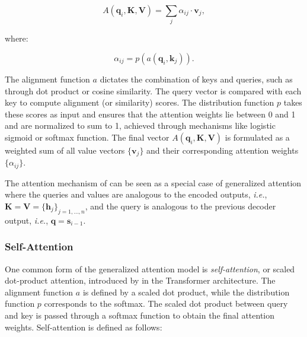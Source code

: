 

\begin{equation}
    A(\bm{q}_i, \bm{K}, \bm{V}) = \sum_j \alpha_{ij} \cdot \bm{v}_j,
\end{equation}

\noindent where:

\begin{equation}
    \alpha_{ij} = p(a(\bm{q}_i, \bm{k}_j)).
\end{equation}

\noindent The alignment function $a$ dictates the combination of keys and queries, such as through dot product or cosine similarity. The query vector is compared with each key to compute alignment (or similarity) scores. The distribution function $p$ takes these scores as input and ensures that the attention weights lie between 0 and 1 and are normalized to sum to 1, achieved through mechanisms like logistic sigmoid or softmax function. The final vector $A(\bm{q}_i, \bm{K}, \bm{V})$ is formulated as a weighted sum of all value vectors $\{\bm{v}_j\}$ and their corresponding attention weights $\{\alpha_{ij}\}$.

The attention mechanism of \citet{bahdanau2014neural} can be seen as a special case of generalized attention where the queries and values are analogous to the encoded outputs, \textit{i.e.}, $\bm{K} = \bm{V} = \{\bm{h}_j\}_{j=1, \ldots, n}$, and the query is analogous to the previous decoder output, \textit{i.e.}, $\bm{q} = \bm{s}_{i-1}$. 


\subsubsection{Self-Attention} 

One common form of the generalized attention model is \textit{self-attention}, or scaled dot-product attention, introduced by \citet{vaswani2017attention} in the Transformer architecture. The alignment function $a$ is defined by a scaled dot product, while the distribution function $p$ corresponds to the softmax. The scaled dot product between query and key is passed through a softmax function to obtain the final attention weights. Self-attention is defined as follows:

